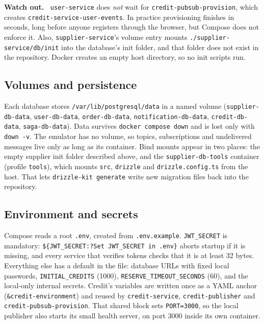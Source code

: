 \documentclass[11pt,a4paper]{article}
\newcommand{\code}[1]{\nolinkurl{#1}}
\newenvironment{caveat}{%
  \def\FrameCommand{{\color{async}\vrule width 2.5pt}\hspace{8pt}}%
  \MakeFramed{\advance\hsize-\width\FrameRestore}\noindent\textbf{Watch out.\ }}%
  {\endMakeFramed}
\begin{document}
\begin{caveat}
\code{user-service} does \emph{not} wait for \code{credit-pubsub-provision}, which
creates \code{credit-service-user-events}. In practice provisioning finishes in seconds,
long before anyone registers through the browser, but Compose does not enforce it. Also,
\code{supplier-service}'s volume entry mounts \code{./supplier-service/db/init} into the
database's init folder, and that folder does not exist in the repository. Docker
creates an empty host directory, so no init scripts run.
\end{caveat}

\subsection{Volumes and persistence}

Each database stores \code{/var/lib/postgresql/data} in a named volume
(\code{supplier-db-data}, \code{user-db-data}, \code{order-db-data},
\code{notification-db-data}, \code{credit-db-data}, \code{saga-db-data}). Data survives
\code{docker compose down} and is lost only with \code{down -v}. The emulator has no
volume, so topics, subscriptions and undelivered messages live only as long as its
container. Bind mounts appear in two places: the empty supplier init folder described
above, and the \code{supplier-db-tools} container (profile \code{tools}), which mounts
\code{src}, \code{drizzle} and \code{drizzle.config.ts} from the host. That lets
\code{drizzle-kit generate} write new migration files back into the repository.

\subsection{Environment and secrets}

Compose reads a root \code{.env}, created from \code{.env.example}. \code{JWT_SECRET} is
mandatory: \texttt{\$\{JWT\_SECRET:?Set JWT\_SECRET in .env\}} aborts startup if it is
missing, and every service that verifies tokens checks that it is at least 32 bytes.
Everything else has a default in the file: database URLs with fixed local passwords,
\code{INITIAL_CREDITS} (1000), \code{RESERVE_TIMEOUT_SECONDS} (60), and the local-only
internal secrets. Credit's variables are written once as a YAML anchor
(\texttt{\&credit-environment}) and reused by \code{credit-service},
\code{credit-publisher} and \code{credit-pubsub-provision}. That shared block sets
\code{PORT=3000}, so the local publisher also starts its small health server, on port
3000 inside its own container.
\end{document}
